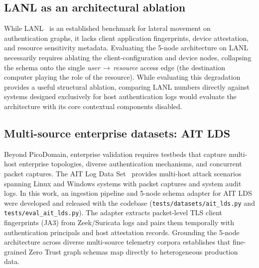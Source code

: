 \subsection{LANL as an architectural ablation}

While LANL~\cite{lanl} is an established benchmark for lateral movement on authentication graphs,
it lacks client application fingerprints, device attestation, and resource sensitivity metadata.
Evaluating the 5-node architecture on LANL necessarily requires ablating the client-configuration
and device nodes, collapsing the schema onto the single \textit{user}\,$\rightarrow$\,\textit{resource}
access edge (the destination computer playing the role of the resource). While evaluating
this degradation provides a useful structural ablation, comparing LANL numbers directly
against systems designed exclusively for host authentication logs would evaluate the architecture
with its core contextual components disabled.

\subsection{Multi-source enterprise datasets: AIT LDS}

Beyond PicoDomain, enterprise validation requires testbeds that capture multi-host enterprise
topologies, diverse authentication mechanisms, and concurrent packet captures. The AIT Log Data
Set~\cite{ait} provides multi-host attack scenarios spanning Linux and Windows systems with packet
captures and system audit logs. In this work, an ingestion pipeline and 5-node schema adapter for
AIT LDS were developed and released with the codebase (\texttt{tests/datasets/ait\_lds.py} and
\texttt{tests/eval\_ait\_lds.py}). The adapter extracts packet-level TLS client fingerprints (JA3)
from Zeek/Suricata logs and pairs them temporally with authentication principals and host attestation
records. Grounding the 5-node architecture across diverse multi-source telemetry corpora establishes
that fine-grained Zero Trust graph schemas map directly to heterogeneous production data.
